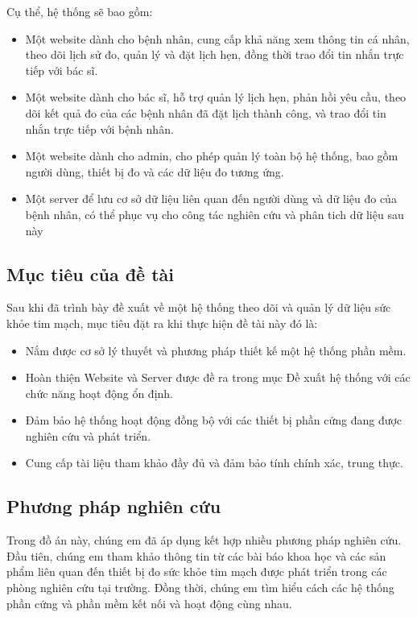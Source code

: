 Cụ thể, hệ thống sẽ bao gồm:

\begin{adjustwidth}{1.5em}{}
  \begin{itemize}
     
      \item Một website dành cho bệnh nhân, cung cấp khả năng xem thông tin cá nhân, theo dõi lịch sử đo, quản lý và đặt lịch hẹn, đồng thời trao đổi tin nhắn trực tiếp với bác sĩ.
      \item Một website dành cho bác sĩ, hỗ trợ quản lý lịch hẹn, phản hồi yêu cầu, theo dõi kết quả đo của các bệnh nhân đã đặt lịch thành công, và trao đổi tin nhắn trực tiếp với bệnh nhân.
      \item Một website dành cho admin, cho phép quản lý toàn bộ hệ thống, bao gồm người dùng, thiết bị đo và các dữ liệu đo tương ứng.
      \item Một server để lưu cơ sở dữ liệu liên quan đến người dùng và dữ liệu đo của bệnh nhân, có thể phục vụ cho công tác nghiên cứu và phân tich dữ liệu sau này

  \end{itemize}
  \end{adjustwidth}


\subsection*{Mục tiêu của đề tài}
Sau khi đã trình bày đề xuất về một hệ thống theo dõi và quản lý dữ liệu sức khỏe tim mạch, mục tiêu đặt ra khi thực hiện
đề tài này đó là:

\begin{adjustwidth}{1.5em}{}
  \begin{itemize}
      \item Nắm được cơ sở lý thuyết và phương pháp thiết kế một hệ thống phần mềm.
      \item Hoàn thiện Website và Server được đề ra trong mục Đề xuất hệ thống với các chức năng hoạt động ổn định.
      \item Đảm bảo hệ thống hoạt động đồng bộ với các thiết bị phần cứng đang được nghiên cứu và phát triển.
      \item Cung cấp tài liệu tham khảo đầy đủ và đảm bảo tính chính xác, trung thực.

  \end{itemize}
  \end{adjustwidth}

\subsection*{Phương pháp nghiên cứu}
Trong đồ án này, chúng em đã áp dụng kết hợp nhiều phương pháp nghiên cứu. Đầu tiên, chúng em tham khảo thông tin từ các bài báo khoa học và các sản phẩm liên quan đến thiết bị đo sức khỏe tim mạch được phát triển trong các phòng nghiên cứu tại trường.
Đồng thời, chúng em tìm hiểu cách các hệ thống phần cứng và phần mềm kết nối và hoạt động cùng nhau. 

